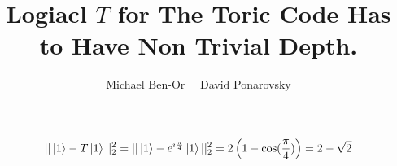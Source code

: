 \documentclass[manuscript,screen,review]{acmart}
\begin{document}

\title{ Logiacl $T$ for The Toric Code Has to Have Non Trivial Depth.}
\author{Michael Ben-Or \ \ David Ponarovsky}
\maketitle

\newcommand*{\Mbas}{\mathcal{X}^\prime}
\newcommand*{\bas}{\mathcal{X}}
\newcommand*{\sMbas}{\Mbas}
\newcommand*{\QQ}{C_{X}/C_{Z}^\perp }
\newcommand*{\trig}{ Triorthogonal }
\newcommand*{\Hyp}{ Hyperproduct }
\newcommand*{\Cin}{ C_{\text{initial}} }
\newcommand*{\Ctan}{ C_{\text{Tan}} }



\newcommand*{\QACze}{ \mathbf{QAC}_{0} }
\newcommand*{\QNCzef}{ \mathbf{QNC}_{0,f} }
\newcommand*{\QNCze}{ \mathbf{QNC}_{0} }
\newcommand*{\QNCon}{ \mathbf{QNC}_{1} }
\newcommand*{\NCon}{ \mathbf{NC}_{1} }
\newcommand*{\noiseQNCon}{ noisy-$\QNCon$ }




\begin{equation*}
  \begin{split}
    || \ket{1} -  T\ket{1} ||_{2}^{2} = || \ket{1} -  e^{i\frac{\pi}{4}}\ket{1} ||_{2}^{2} = 2\left(1 - \cos(\frac{\pi}{4})\right) = 2 - \sqrt{2}
  \end{split}
\end{equation*}



\printbibliography
\end{document}
